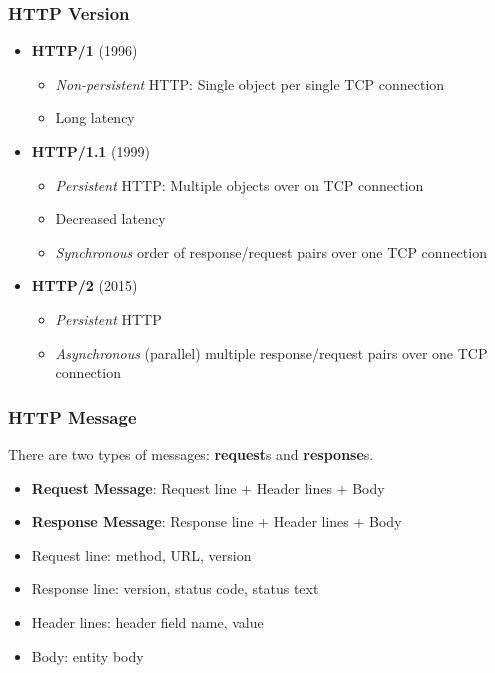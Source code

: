 \subsubsection{HTTP Version}
\begin{itemize}
	\item \textbf{HTTP/1} (1996)
	\begin{itemize}
		\item \textit{Non-persistent} HTTP: Single object per single TCP connection
		\item Long latency
	\end{itemize}
	\item \textbf{HTTP/1.1} (1999)
	\begin{itemize}
		\item \textit{Persistent} HTTP: Multiple objects over on TCP connection
		\item Decreased latency
		\item \textit{Synchronous} order of response/request pairs over one TCP connection
	\end{itemize}
	\item \textbf{HTTP/2} (2015)
	\begin{itemize}
		\item \textit{Persistent} HTTP
		\item \textit{Asynchronous} (parallel) multiple response/request pairs over one TCP connection
	\end{itemize}
\end{itemize}

\subsubsection{HTTP Message}
There are two types of messages: \textbf{request}s and \textbf{response}s.
\begin{itemize}
	\item \textbf{Request Message}: Request line + Header lines + Body
	\item \textbf{Response Message}: Response line + Header lines + Body
	\item Request line: method, URL, version
	\item Response line: version, status code, status text
	\item Header lines: header field name, value
	\item Body: entity body
\end{itemize}

